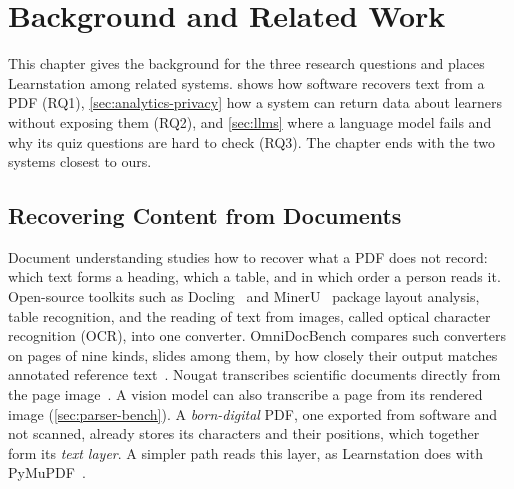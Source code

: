 \chapter{Background and Related Work}
\label{ch:background}

This chapter gives the background for the three research questions and places
Learnstation among related systems.  shows how software
recovers text from a PDF (RQ1), \cref{sec:analytics-privacy} how a system can
return data about learners without exposing them (RQ2), and \cref{sec:llms}
where a language model fails and why its quiz questions are hard to check
(RQ3). The chapter ends with the two systems closest to ours.

\section{Recovering Content from Documents}
\label{sec:document-ai}

Document understanding studies how to recover what a PDF does not record:
which text forms a heading, which a table, and in which order a person reads
it. Open-source toolkits such as Docling~\cite{auer2024docling} and
MinerU~\cite{wang2024mineru} package layout analysis, table recognition, and
the reading of text from images, called optical character recognition (OCR),
into one converter. OmniDocBench compares such converters on pages of nine
kinds, slides among them, by how closely their output matches annotated
reference text~\cite{ouyang2025omnidocbench}. Nougat transcribes scientific
documents directly from the page image~\cite{blecher2023nougat}. A
vision model can also transcribe a page from its rendered image
(\cref{sec:parser-bench}). A
\emph{born-digital} PDF, one exported from software and not scanned, already
stores its characters and their positions, which together form its
\emph{text layer}. A simpler path reads this layer, as Learnstation does
with PyMuPDF~\cite{pymupdf}.

